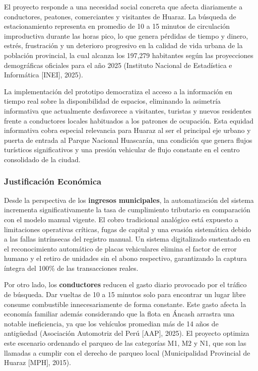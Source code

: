 \documentclass[12pt,a4paper]{article}
\begin{document}
El proyecto responde a una necesidad social concreta que afecta diariamente a conductores, peatones, comerciantes y visitantes de Huaraz. La búsqueda de estacionamiento representa en promedio de 10 a 15 minutos de circulación improductiva durante las horas pico, lo que genera pérdidas de tiempo y dinero, estrés, frustración y un deterioro progresivo en la calidad de vida urbana de la población provincial, la cual alcanza los 197,279 habitantes según las proyecciones demográficas oficiales para el año 2025 (Instituto Nacional de Estadística e Informática [INEI], 2025).

La implementación del prototipo democratiza el acceso a la información en tiempo real sobre la disponibilidad de espacios, eliminando la asimetría informativa que actualmente desfavorece a visitantes, turistas y nuevos residentes frente a conductores locales habituados a los patrones de ocupación. Esta equidad informativa cobra especial relevancia para Huaraz al ser el principal eje urbano y puerta de entrada al Parque Nacional Huascarán, una condición que genera flujos turísticos significativos y una presión vehicular de flujo constante en el centro consolidado de la ciudad.


\subsubsection{Justificación Económica}

Desde la perspectiva de los \textbf{ingresos municipales}, la automatización del sistema incrementa significativamente la tasa de cumplimiento tributario en comparación con el modelo manual vigente. El cobro tradicional analógico está expuesto a limitaciones operativas críticas, fugas de capital y una evasión sistemática debido a las fallas intrínsecas del registro manual. Un sistema digitalizado sustentado en el reconocimiento automático de placas vehiculares elimina el factor de error humano y el retiro de unidades sin el abono respectivo, garantizando la captura íntegra del 100\% de las transacciones reales.

Por otro lado, los \textbf{conductores} reducen el gasto diario provocado por el tráfico de búsqueda. Dar vueltas de 10 a 15 minutos solo para encontrar un lugar libre consume combustible innecesariamente de forma constante. Este gasto afecta la economía familiar además considerando que la flota en Áncash arrastra una notable ineficiencia, ya que los vehículos promedian más de 14 años de antigüedad (Asociación Automotriz del Perú [AAP], 2025). El proyecto optimiza este escenario ordenando el parqueo de las categorías M1, M2 y N1, que son las llamadas a cumplir con el derecho de parqueo local (Municipalidad Provincial de Huaraz [MPH], 2015).
\end{document}
